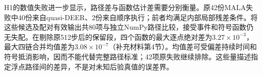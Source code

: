 H1的数值失败进一步显示，路径差与函数估计差需要分别衡量。原42份MALA失败中40份来自quasi-DEER、2份来自顺序执行；前者均满足内部局部残差条件。将这些候选及配对有效输出共80项与独立NumPy路径比较，接受事件和符号函数仍无失配。在剔除原512步后的保留段，四个函数的最大逐点绝对差为$3.27\times10^{-3}$，最大四链合并均值差为$3.08\times10^{-7}$（补充材料第4节）。均值差可受偏差持续时间和符号抵消影响，因而不能代替完整路径标准；42项原失败继续排除。这些量描述指定浮点路径间的差异，不是对未知后验真值的误差界。
